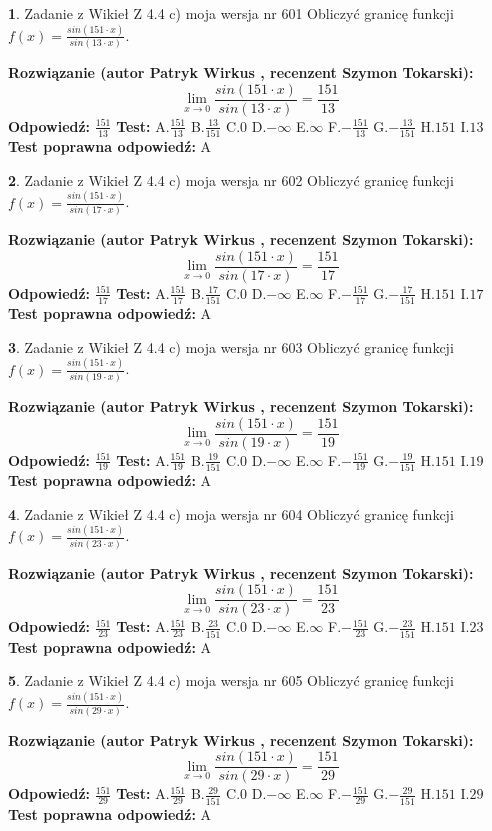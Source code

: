 \documentclass[12pt, a4paper]{article}
\theoremstyle{definition} %
\newtheorem{zad}{}
\newcommand{\zadStart}[1]{\begin{zad}#1\newline}
\newcommand{\zadStop}{\end{zad}}
\newcommand{\rozwStart}[2]{\noindent \textbf{Rozwiązanie (autor #1 , recenzent #2): }\newline}
\newcommand{\rozwStop}{\newline}
\newcommand{\odpStart}{\noindent \textbf{Odpowiedź:}\newline}
\newcommand{\odpStop}{\newline}
\newcommand{\testStart}{\noindent \textbf{Test:}\newline}
\newcommand{\testStop}{\newline}
\newcommand{\kluczStart}{\noindent \textbf{Test poprawna odpowiedź:}\newline}
\newcommand{\kluczStop}{\newline}
\begin{document}
\zadStart{Zadanie z Wikieł Z 4.4 c) moja wersja nr 601}
Obliczyć granicę funkcji $f(x)=\frac{sin(151\cdot x)}{sin(13\cdot x)}$.
\zadStop
\rozwStart{Patryk Wirkus}{Szymon Tokarski}
$$\lim\limits_{x\to 0}\frac{sin(151\cdot x)}{sin(13\cdot x)}=
\frac{151}{13}$$
\rozwStop
\odpStart
$\frac{151}{13}$
\odpStop
\testStart
A.$\frac{151}{13}$
B.$\frac{13}{151}$
C.$0$
D.$-\infty$
E.$\infty$
F.$-\frac{151}{13}$
G.$-\frac{13}{151}$
H.$151$
I.$13$
\testStop
\kluczStart
A
\kluczStop



\zadStart{Zadanie z Wikieł Z 4.4 c) moja wersja nr 602}
Obliczyć granicę funkcji $f(x)=\frac{sin(151\cdot x)}{sin(17\cdot x)}$.
\zadStop
\rozwStart{Patryk Wirkus}{Szymon Tokarski}
$$\lim\limits_{x\to 0}\frac{sin(151\cdot x)}{sin(17\cdot x)}=
\frac{151}{17}$$
\rozwStop
\odpStart
$\frac{151}{17}$
\odpStop
\testStart
A.$\frac{151}{17}$
B.$\frac{17}{151}$
C.$0$
D.$-\infty$
E.$\infty$
F.$-\frac{151}{17}$
G.$-\frac{17}{151}$
H.$151$
I.$17$
\testStop
\kluczStart
A
\kluczStop



\zadStart{Zadanie z Wikieł Z 4.4 c) moja wersja nr 603}
Obliczyć granicę funkcji $f(x)=\frac{sin(151\cdot x)}{sin(19\cdot x)}$.
\zadStop
\rozwStart{Patryk Wirkus}{Szymon Tokarski}
$$\lim\limits_{x\to 0}\frac{sin(151\cdot x)}{sin(19\cdot x)}=
\frac{151}{19}$$
\rozwStop
\odpStart
$\frac{151}{19}$
\odpStop
\testStart
A.$\frac{151}{19}$
B.$\frac{19}{151}$
C.$0$
D.$-\infty$
E.$\infty$
F.$-\frac{151}{19}$
G.$-\frac{19}{151}$
H.$151$
I.$19$
\testStop
\kluczStart
A
\kluczStop



\zadStart{Zadanie z Wikieł Z 4.4 c) moja wersja nr 604}
Obliczyć granicę funkcji $f(x)=\frac{sin(151\cdot x)}{sin(23\cdot x)}$.
\zadStop
\rozwStart{Patryk Wirkus}{Szymon Tokarski}
$$\lim\limits_{x\to 0}\frac{sin(151\cdot x)}{sin(23\cdot x)}=
\frac{151}{23}$$
\rozwStop
\odpStart
$\frac{151}{23}$
\odpStop
\testStart
A.$\frac{151}{23}$
B.$\frac{23}{151}$
C.$0$
D.$-\infty$
E.$\infty$
F.$-\frac{151}{23}$
G.$-\frac{23}{151}$
H.$151$
I.$23$
\testStop
\kluczStart
A
\kluczStop



\zadStart{Zadanie z Wikieł Z 4.4 c) moja wersja nr 605}
Obliczyć granicę funkcji $f(x)=\frac{sin(151\cdot x)}{sin(29\cdot x)}$.
\zadStop
\rozwStart{Patryk Wirkus}{Szymon Tokarski}
$$\lim\limits_{x\to 0}\frac{sin(151\cdot x)}{sin(29\cdot x)}=
\frac{151}{29}$$
\rozwStop
\odpStart
$\frac{151}{29}$
\odpStop
\testStart
A.$\frac{151}{29}$
B.$\frac{29}{151}$
C.$0$
D.$-\infty$
E.$\infty$
F.$-\frac{151}{29}$
G.$-\frac{29}{151}$
H.$151$
I.$29$
\testStop
\kluczStart
A
\kluczStop
\end{document}
